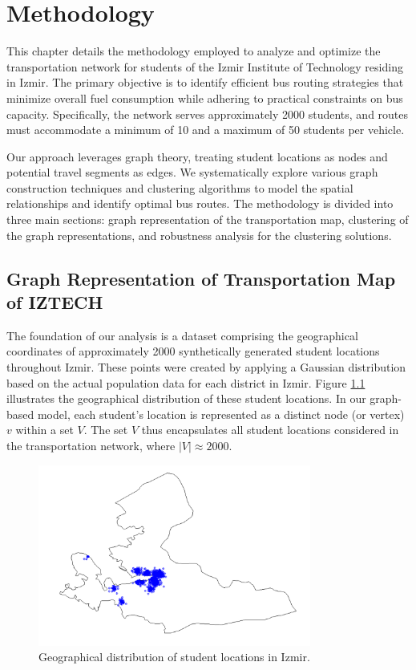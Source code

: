 \chapter{Methodology}
\label{ch:method}

This chapter details the methodology employed to analyze and optimize the transportation network for students of the Izmir Institute of Technology residing in Izmir. The primary objective is to identify efficient bus routing strategies that minimize overall fuel consumption while adhering to practical constraints on bus capacity. Specifically, the network serves approximately 2000 students, and routes must accommodate a minimum of 10 and a maximum of 50 students per vehicle. 

Our approach leverages graph theory, treating student locations as nodes and potential travel segments as edges. We systematically explore various graph construction techniques and clustering algorithms to model the spatial relationships and identify optimal bus routes. The methodology is divided into three main sections: graph representation of the transportation map, clustering of the graph representations, and robustness analysis for the clustering solutions.

\section{Graph Representation of Transportation Map of IZTECH}
\label{sec:graph_representation}

The foundation of our analysis is a dataset comprising the geographical coordinates of approximately 2000 synthetically generated student locations throughout Izmir. These points were created by applying a Gaussian distribution based on the actual population data for each district in Izmir. Figure \ref{fig:student_map} illustrates the geographical distribution of these student locations. In our graph-based model, each student's location is represented as a distinct node (or vertex) $v$ within a set $V$. The set $V$ thus encapsulates all student locations considered in the transportation network, where $|V| \approx 2000$. 

\begin{figure}[!htbp]
\centering
\includegraphics[width=0.8\textwidth]{img/student_map}
\caption{Geographical distribution of student locations in Izmir.}
\label{fig:student_map}
\end{figure}

